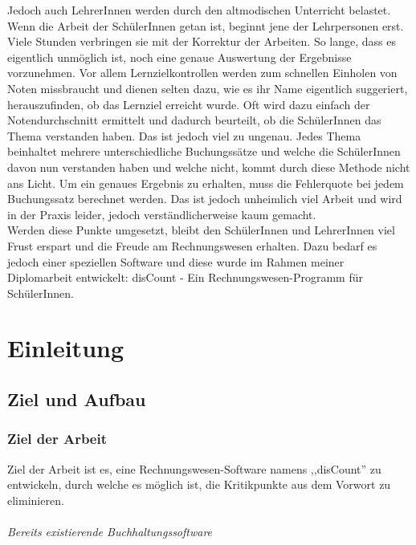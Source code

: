 \documentclass[12pt]{report}
\begin{document}
\noindent Jedoch auch LehrerInnen werden durch den altmodischen Unterricht belastet. Wenn die Arbeit der SchülerInnen getan ist, beginnt jene der Lehrpersonen erst. Viele Stunden verbringen sie mit der Korrektur der Arbeiten. So lange, dass es eigentlich unmöglich ist, noch eine genaue Auswertung der Ergebnisse vorzunehmen. Vor allem Lernzielkontrollen werden zum schnellen Einholen von Noten missbraucht und dienen selten dazu, wie es ihr Name eigentlich suggeriert, herauszufinden, ob das Lernziel erreicht wurde. Oft wird dazu einfach der Notendurchschnitt ermittelt und dadurch beurteilt, ob die SchülerInnen das Thema verstanden haben. Das ist jedoch viel zu ungenau. Jedes Thema beinhaltet mehrere unterschiedliche Buchungssätze und welche die SchülerInnen davon nun verstanden haben und welche nicht, kommt durch diese Methode nicht ans Licht. Um ein genaues Ergebnis zu erhalten, muss die Fehlerquote bei jedem Buchungssatz berechnet werden. Das ist jedoch unheimlich viel Arbeit und wird in der Praxis leider, jedoch verständlicherweise kaum gemacht.\\

\noindent Werden diese Punkte umgesetzt, bleibt den SchülerInnen und LehrerInnen viel Frust erspart und die Freude am Rechnungswesen erhalten. Dazu bedarf es jedoch einer speziellen Software und diese wurde im Rahmen meiner Diplomarbeit entwickelt: disCount - Ein Rechnungswesen-Programm für SchülerInnen.
  
  

  
\tableofcontents



\part{Einleitung} 

    
   

  
\chapter{Ziel und Aufbau}
\lhead{\thepage}
\section{Ziel der Arbeit}
Ziel der Arbeit ist es, eine Rechnungswesen-Software namens ,,disCount'' zu entwickeln, durch welche es möglich ist, die Kritikpunkte aus dem Vorwort zu eliminieren.

\paragraph{Bereits existierende Buchhaltungssoftware}  
\end{document}
